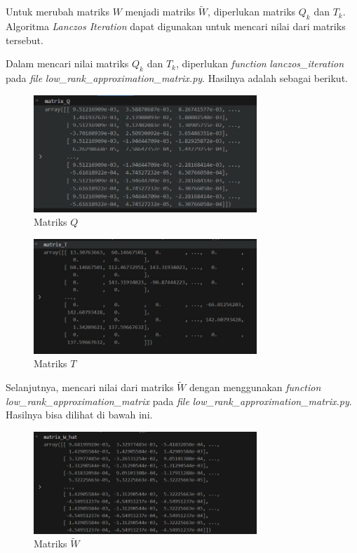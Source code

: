 Untuk merubah matriks $W$ menjadi matriks $\tilde{W}$, diperlukan matriks
$Q_k$ dan $T_k$. Algoritma \textit{Lanczos Iteration} dapat digunakan untuk
mencari nilai dari matriks tersebut.

Dalam mencari nilai matriks $Q_k$ dan $T_k$, diperlukan \textit{function} 
\textit{lanczos\_iteration} pada \textit{file} \textit{low\_rank\_approximation\_matrix.py}.
Hasilnya adalah sebagai berikut.


\begin{figure}[H]
  \centering
  \includegraphics[width=0.75\textwidth]{gambar/bab_4_image/Matrix q.jpg}
  \caption{Matriks $Q$}
  \label{gambar:matrixQ}
\end{figure}

\begin{figure}[H]
  \centering
  \includegraphics[width=0.75\textwidth]{gambar/bab_4_image/Matrix t.jpg}
  \caption{Matriks $T$}
  \label{gambar:matrixT}
\end{figure}

Selanjutnya, mencari nilai dari matriks $\tilde{W}$ dengan menggunakan \textit{function}
\textit{low\_rank\_approximation\_matrix} pada \textit{file} \textit{low\_rank\_approximation\_matrix.py}.
Hasilnya bisa dilihat di bawah ini.

\begin{figure}[H]
  \centering
  \includegraphics[width=0.75\textwidth]{gambar/bab_4_image/matrix w hat.jpg}
  \caption{Matriks $\tilde{W}$}
  \label{gambar:matrixWHat}
\end{figure}

